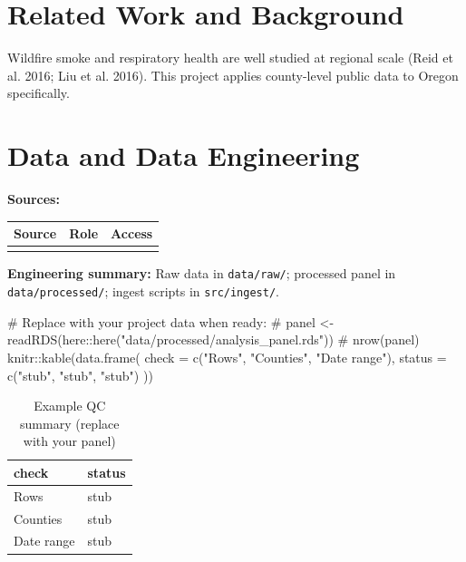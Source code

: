 \documentclass[
  letterpaper,
  DIV=11,
  numbers=noendperiod]{scrartcl}
\newenvironment{Shaded}{\begin{snugshade}}{\end{snugshade}}
\newcommand{\AttributeTok}[1]{\textcolor[rgb]{0.40,0.45,0.13}{#1}}
\newcommand{\CommentTok}[1]{\textcolor[rgb]{0.37,0.37,0.37}{#1}}
\newcommand{\FunctionTok}[1]{\textcolor[rgb]{0.28,0.35,0.67}{#1}}
\newcommand{\NormalTok}[1]{\textcolor[rgb]{0.00,0.23,0.31}{#1}}
\newcommand{\SpecialCharTok}[1]{\textcolor[rgb]{0.37,0.37,0.37}{#1}}
\newcommand{\StringTok}[1]{\textcolor[rgb]{0.13,0.47,0.30}{#1}}
\begin{document}
\section{Related Work and Background}\label{related-work-and-background}

Wildfire smoke and respiratory health are well studied at regional scale
(Reid et al. 2016; Liu et al. 2016). This project applies county-level
public data to Oregon specifically.

\section{Data and Data Engineering}\label{data-and-data-engineering}

\textbf{Sources:}

\begin{longtable}[]{@{}lll@{}}
\toprule\noalign{}
Source & Role & Access \\
\midrule\noalign{}
\endhead
\bottomrule\noalign{}
\endlastfoot
& & \\
\end{longtable}

\textbf{Engineering summary:} Raw data in \texttt{data/raw/}; processed
panel in \texttt{data/processed/}; ingest scripts in
\texttt{src/ingest/}.

\begin{Shaded}
\begin{Highlighting}[]
\CommentTok{\# Replace with your project data when ready:}
\CommentTok{\# panel \textless{}{-} readRDS(here::here("data/processed/analysis\_panel.rds"))}
\CommentTok{\# nrow(panel)}
\NormalTok{knitr}\SpecialCharTok{::}\FunctionTok{kable}\NormalTok{(}\FunctionTok{data.frame}\NormalTok{(}
  \AttributeTok{check =} \FunctionTok{c}\NormalTok{(}\StringTok{"Rows"}\NormalTok{, }\StringTok{"Counties"}\NormalTok{, }\StringTok{"Date range"}\NormalTok{),}
  \AttributeTok{status =} \FunctionTok{c}\NormalTok{(}\StringTok{"stub"}\NormalTok{, }\StringTok{"stub"}\NormalTok{, }\StringTok{"stub"}\NormalTok{)}
\NormalTok{))}
\end{Highlighting}
\end{Shaded}

\begin{longtable}[]{@{}ll@{}}

\caption{\label{tbl-data-qc}Example QC summary (replace with your
panel)}

\tabularnewline

\toprule\noalign{}
check & status \\
\midrule\noalign{}
\endhead
\bottomrule\noalign{}
\endlastfoot
Rows & stub \\
Counties & stub \\
Date range & stub \\

\end{longtable}
\end{document}
